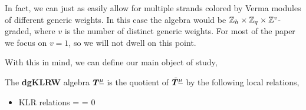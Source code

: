 \documentclass{article}
\begin{document}
\begin{rem}
    In fact, we can just as easily allow for multiple strands colored by Verma modules of different generic weights. In this case the algebra would be ${\mathbb Z}_h \times {\mathbb Z}_q \times {\mathbb Z}^v$-graded, where $v$ is the number of distinct generic weights. For most of the paper we focus on $v=1$, so we will not dwell on this point. 
\end{rem}
With this in mind, we can define our main object of study,
\begin{defn}{\cite{Na}}\label{def:dgKLRWalgebra}
    The \textbf{dgKLRW} algebra ${\boldsymbol{T}}^{\underline{\mu}}$ is the quotient of $\tilde{{\boldsymbol{T}}}^{\underline{\mu}}$ by the following local relations, 
    \begin{itemize}
        \item KLR relations
        \be {} \hspace{2mm}
      =\hspace{2mm}
       \hspace{40mm}  \hspace{2mm}= \hspace{2mm}0 \ee


\end{itemize}
\end{defn}
\end{document}
